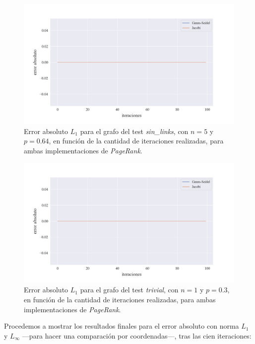 \vspace{1em}
\begin{figure}[!htbp]
    \centering
    \includegraphics[width=.9\textwidth]{files/src/.media/convergencia_test_sin_links.png}
    \caption{Error absoluto $L_1$ para el grafo del test \textit{sin\_links}, con $n = 5$ y $p = 0.64$, en función de la cantidad de iteraciones realizadas, para ambas implementaciones de \textit{PageRank}.} \label{test_sin_links}
\end{figure}

\vspace{1em}
\begin{figure}[!htbp]
    \centering
    \includegraphics[width=.9\textwidth]{files/src/.media/convergencia_test_trivial.png}
    \caption{Error absoluto $L_1$ para el grafo del test \textit{trivial}, con $n = 1$ y $p = 0.3$, en función de la cantidad de iteraciones realizadas, para ambas implementaciones de \textit{PageRank}.} \label{test_trivial}
\end{figure}

\vspace*{1em}
Procedemos a mostrar los resultados finales para el error absoluto con norma $L_1$ y $L_{\infty}$ ---para hacer una comparación por coordenadas---, tras las cien iteraciones:

